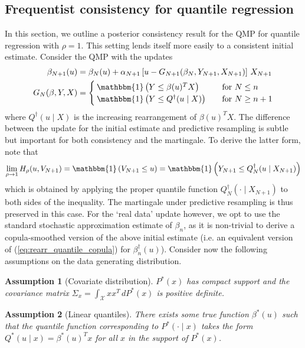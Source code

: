 \documentclass[11pt,a4paper]{article}
\newtheorem{as}{Assumption}
\begin{document}
\begin{appendices}
\subsection{Frequentist consistency for quantile regression}\label{app:sec:QR_consistency}
In this section, we outline a posterior consistency result for the QMP for quantile regression with $\rho = 1$. This setting lends itself more easily to a consistent initial estimate. Consider the QMP with the updates
\begin{align}\label{eq:beta_consist1}
    \beta_{N+1}(u) &=\beta_N(u) + \alpha_{N+1} \left[u - G_{N+1}(\beta_N,Y_{N+1},X_{N+1})\right]\, X_{N+1}\\
        G_{N}(\beta,Y,X)&= \begin{cases}
         \mathbbm{1}\left(Y \leq \beta(u)^TX\right)\quad &\text{for } N \leq n\\
            \mathbbm{1}\left(Y \leq Q^{\dagger}(u \mid X)\right)\quad &\text{for } N \geq n+1
       \end{cases}\label{eq:beta_consist2}
\end{align}
where $Q^{\dagger}(u \mid X)$ is the increasing rearrangement of $\beta(u)^TX$.
The difference between the update for the initial estimate and predictive resampling is subtle but important for both consistency and the martingale.
To derive the latter form, note that
\begin{align*}
   \lim_{\rho \to 1} H_\rho(u,V_{N+1}) = \mathbbm{1}\left(V_{N+1}\leq u\right) = \mathbbm{1}\left(Y_{N+1} \leq Q_{N}^{\dagger}(u \mid X_{N+1})\right)  
\end{align*}
which is obtained by applying the proper quantile function $Q_{N}^{\dagger}(\cdot \mid X_{N+1})$ to both sides of the inequality. The martingale under predictive resampling is thus preserved in this case. 
For the `real data' update however, we opt to use the standard stochastic approximation estimate of $\beta_n$, as it is non-trivial to derive a copula-smoothed version of the above initial estimate (i.e. an equivalent version of (\ref{eq:rearr_quantile_copula}) for $\beta_n^{\dagger}(u)$). Consider now the following assumptions on the data generating distribution.
\begin{as}[Covariate distribution]\label{ass:covariate}
 $P^*(x)$ has compact support and the covariance matrix $\Sigma_x = \int_{\mathcal{X}} x x^T \, dP^*(x)$ is positive definite. 
\end{as}
\begin{as}[Linear quantiles]\label{ass:linear}
 There exists some true function $\beta^*(u)$ such that the quantile function corresponding to $P^*(\cdot \mid x)$ takes the form $Q^*(u \mid x)= \beta^*(u)^Tx$ for all $x$ in the support of $P^*(x)$.

\end{as}
\end{appendices}
\end{document}
